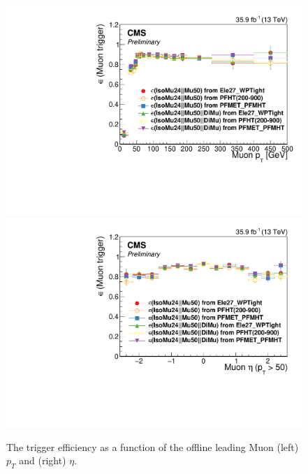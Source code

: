 \begin{figure}[tbp]
 \begin{center}
   \includegraphics[width=0.49\linewidth]{sections/mc4/EvtSelSBOpt/figures/MuonPT.pdf}
   \includegraphics[width=0.49\linewidth]{sections/mc4/EvtSelSBOpt/figures/MuonEta.pdf}
   \caption{ The trigger efficiency as a function of the offline leading Muon
	 (left) $p_{T}$ and (right) $\eta$.}
   \label{fig:TrigMuon}
 \end{center}
\end{figure}


